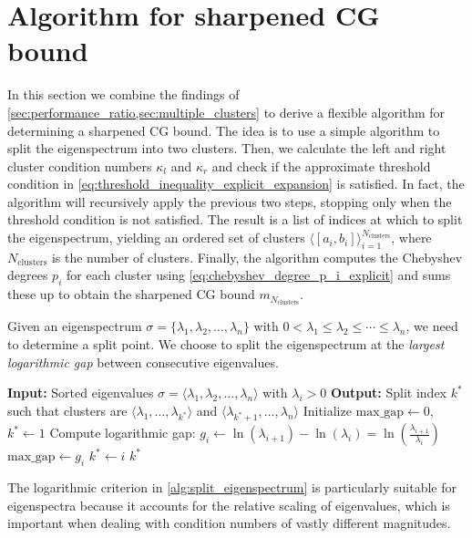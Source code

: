 \section{Algorithm for sharpened CG bound}\label{sec:cg_iteration_bound_algorithm}
In this section we combine the findings of \cref{sec:performance_ratio,sec:multiple_clusters} to derive a flexible algorithm for determining a sharpened CG bound. The idea is to use a simple algorithm to split the eigenspectrum into two clusters. Then, we calculate the left and right cluster condition numbers $\kappa_l$ and $\kappa_r$ and check if the approximate threshold condition in \cref{eq:threshold_inequality_explicit_expansion} is satisfied. In fact, the algorithm will recursively apply the previous two steps, stopping only when the threshold condition is not satisfied. The result is a list of indices at which to split the eigenspectrum, yielding an ordered set of clusters $\langle[a_i, b_i]\rangle_{i=1}^{N_{\text{clusters}}}$, where $N_{\text{clusters}}$ is the number of clusters. Finally, the algorithm computes the Chebyshev degrees $p_i$ for each cluster using \cref{eq:chebyshev_degree_p_i_explicit} and sums these up to obtain the sharpened CG bound $m_{N_{\text{clusters}}}$.

Given an eigenspectrum $\sigma = \{\lambda_1, \lambda_2, \ldots, \lambda_n\}$ with $0 < \lambda_1 \leq \lambda_2 \leq \cdots \leq \lambda_n$, we need to determine a split point. We choose to split the eigenspectrum at the \textit{largest logarithmic gap} between consecutive eigenvalues.
\begin{algorithm}[H]
    \caption{$\operatorname{SplitEigenspectrum}(\sigma)$}
    \begin{algorithmic}[1]
        \State \textbf{Input:} Sorted eigenvalues $\sigma = \langle\lambda_1, \lambda_2, \ldots, \lambda_n\rangle$ with $\lambda_i > 0$
        \State \textbf{Output:} Split index $k^*$ such that clusters are $\langle\lambda_1, \ldots, \lambda_{k^*}\rangle$ and $\langle\lambda_{k^*+1}, \ldots, \lambda_n\rangle$
        \State Initialize $\text{max\_gap} \gets 0$, $k^* \gets 1$
        \State Compute logarithmic gap: $g_i \gets \ln(\lambda_{i+1}) - \ln(\lambda_i) = \ln\left(\frac{\lambda_{i+1}}{\lambda_i}\right)$
        \State $\text{max\_gap} \gets g_i$
        \State $k^* \gets i$
        \EndIf
        \EndFor
        \State \Return $k^*$
    \end{algorithmic}
    \label{alg:split_eigenspectrum}
\end{algorithm}
The logarithmic criterion in \cref{alg:split_eigenspectrum} is particularly suitable for eigenspectra because it accounts for the relative scaling of eigenvalues, which is important when dealing with condition numbers of vastly different magnitudes.

